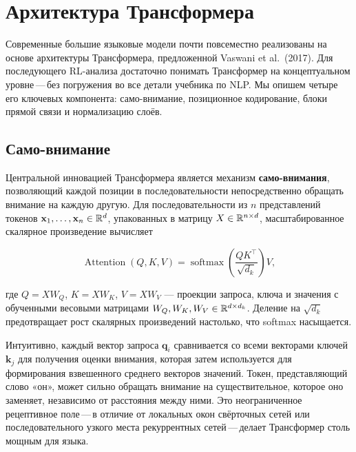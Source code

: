 \section{Архитектура Трансформера}
\label{sec:transformer}

Современные большие языковые модели почти повсеместно реализованы на основе архитектуры Трансформера, предложенной Vaswani et al.\ (2017). Для последующего RL-анализа достаточно понимать Трансформер на концептуальном уровне\,---\,без погружения во все детали учебника по NLP. Мы опишем четыре его ключевых компонента: само-внимание, позиционное кодирование, блоки прямой связи и нормализацию слоёв.

\subsection{Само-внимание}

Центральной инновацией Трансформера является механизм \textbf{само-внимания}, позволяющий каждой позиции в последовательности непосредственно обращать внимание на каждую другую. Для последовательности из $n$ представлений токенов $\mathbf{x}_1, \ldots, \mathbf{x}_n \in \mathbb{R}^d$, упакованных в матрицу $X \in \mathbb{R}^{n \times d}$, масштабированное скалярное произведение вычисляет

\begin{equation}
\label{eq:self-attention}
\operatorname{Attention}(Q, K, V) = \operatorname{softmax}\!\left(\frac{QK^\top}{\sqrt{d_k}}\right) V,
\end{equation}

где $Q = XW_Q$, $K = XW_K$, $V = XW_V$ --- проекции запроса, ключа и значения с обученными весовыми матрицами $W_Q, W_K, W_V \in \mathbb{R}^{d \times d_k}$. Деление на $\sqrt{d_k}$ предотвращает рост скалярных произведений настолько, что softmax насыщается.

Интуитивно, каждый вектор запроса $\mathbf{q}_i$ сравнивается со всеми векторами ключей $\mathbf{k}_j$ для получения оценки внимания, которая затем используется для формирования взвешенного среднего векторов значений. Токен, представляющий слово «он», может сильно обращать внимание на существительное, которое оно заменяет, независимо от расстояния между ними. Это неограниченное рецептивное поле\,---\,в отличие от локальных окон свёрточных сетей или последовательного узкого места рекуррентных сетей\,---\,делает Трансформер столь мощным для языка.


